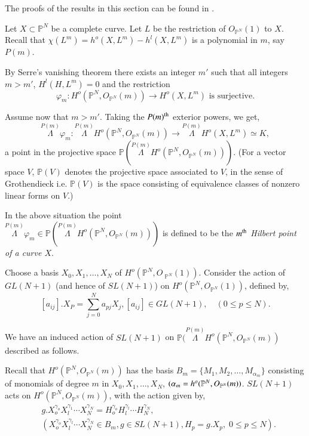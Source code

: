 {\begin{subtheorem}
The proofs of the results in this section can be found in \cite{key5}.
\end{subtheorem}

\medskip
{}

Let $X \subset \mathbb{P}^N$ be a complete curve. Let $L$ be the
restriction of $O_{\mathbb{P}^N}(1)$ to $X$. Recall that $\chi(L^m) =
h^o(X,L^m)-h^l(X,L^m)$ is a polynomial in $m$, say $P(m)$. 

By Serre's vanishing theorem there exists an integer $m'$ such that
all integers $m > m'$, $H^l(H,L^m) = 0$ and the restriction 
$$
\varphi_m : H^o (\mathbb{P}^N, O_{\mathbb{P}^N}(m)) \rightarrow
H^o(X,L^m) \text{ is surjective}. 
$$

Assume now that $m > m'$. Taking the $P(m)^{\rm th}$ exterior powers, we
get, 
$$
\overset{P(m)}{\Lambda} \varphi_m : \overset{P(m)}{\Lambda} 
H^o(\mathbb{P}^N,O_{\mathbb{P}^N}(m)) \rightarrow
\overset{P(m)}{\Lambda} H^o(X,L^m) \simeq K, 
$$
a point in the projective space $\mathbb{P}(\overset{P(m)}{\Lambda}
H^o(\mathbb{P}^N,O_{\mathbb{P}^N}(m)))$. (For a vector space $V$,
$\mathbb{P}(V)$ denotes the projective space associated to $V$, in the
sense of Grothendieck i.e. $\mathbb{P}(V)$ is the space consisting of
equivalence classes of nonzero linear forms on $V$.) 


\setcounter{subsection}{1}
\setcounter{subdefin}{-1}
\begin{subdefin}\label{chap0:subdef0.1.0}%
In \pageoriginale the above situation the point \\
\noindent
$\overset{P(m)}{\Lambda} \varphi_m
\in \mathbb{P} (\overset{P(m)}{\Lambda}
H^o(\mathbb{P}^N, O_{\mathbb{P}^N}(m)))$ is defined to be the
{\em{$m^{\rm th}$ Hilbert point of a curve $X$}}. 

Choose a basis $X_0,X_1,\ldots,X_N$ of
$H^o(\mathbb{P}^N, O~_{\mathbb{P}^N}(1))$. Consider the action of
$GL(N+1)$ (and hence of $SL(N+1)$) on $H^o
(\mathbb{P}^N, O_{\mathbb{P}^N}(1))$, defined by, 
$$
[a_{ij}]. X_P = \sum_{j=0}^{N}
a_{pj}X_j, [a_{ij}] \in GL(N+1),\quad (0\le p \le N). 
$$

\label{c0:l(n+1)}
We have an induced action of $SL(N+1)$ on
$\mathbb{P}(\overset{P(m)}{\Lambda} H^o(\mathbb{P}^N,
O_{\mathbb{P}^N}(m))$ described as follows.  

Recall that $H^o(\mathbb{P}^N,O_{\mathbb{P}^N} (m))$ has the basis
$B_m = \{M_1,M_2,\ldots,M_{\alpha_m} \}$ consisting of monomials of
degree $m$ in $X_0, X_1,\ldots,X_N$, $(\alpha_m = h^o (\mathbb{P}^N,\break
O_{\mathbb{P}^{N}}(m))$. $SL(N+1)$ acts on $H^o
(\mathbb{P}^N,O_{\mathbb{P}^N}(m))$, with the action given by, 
\begin{align*}
& g.X^{\gamma_o}_o X^{\gamma_1}_l \cdots X^{\gamma_N}_N =
  H^{\gamma_o}_o H^{\gamma_l}_l \cdots H^{\gamma_N}_N,\\ 
& (X^{\gamma_o}_o X^{\gamma_l}_l \cdots X^{\gamma_N}_N \in
  B_m, g \in  SL(N+1), H_p = g.X_p, \; 0\le p \le N). 
\end{align*}


\end{subdefin}}
